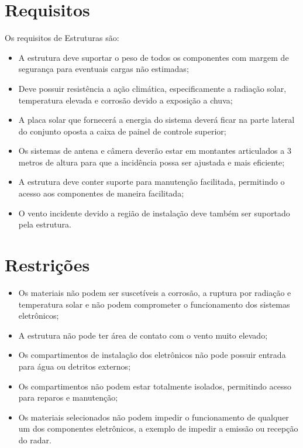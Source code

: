 \section{Requisitos}

Os requisitos de Estruturas são:


\begin{itemize}
\item A estrutura deve suportar o peso de todos os componentes com margem de segurança para eventuais cargas não estimadas;
\item Deve possuir resistência a ação climática, especificamente a radiação solar, temperatura elevada e corrosão devido a exposição a chuva;
\item A placa solar que fornecerá a energia do sistema deverá ficar na parte lateral do conjunto oposta a caixa de painel de controle superior;
\item Os sistemas de antena e câmera deverão estar em montantes articulados a 3 metros de altura para que a incidência possa ser ajustada e mais eficiente;
\item A estrutura deve conter suporte para manutenção facilitada, permitindo o acesso aos componentes de maneira facilitada;
\item O vento incidente devido a região de instalação deve também ser suportado pela estrutura.
\end{itemize}

\section{Restrições}
\begin{itemize}
\item Os materiais não podem ser suscetíveis a corrosão, a ruptura por radiação e temperatura solar e não podem comprometer o funcionamento dos sistemas eletrônicos;
\item A estrutura não pode ter área de contato com o vento muito elevado;
\item Os compartimentos de instalação dos eletrônicos não pode possuir entrada para água ou detritos externos;
\item Os compartimentos não podem estar totalmente isolados, permitindo acesso para reparos e manutenção;
\item Os materiais selecionados não podem impedir o funcionamento de qualquer um dos componentes eletrônicos, a exemplo de impedir a emissão ou recepção do radar.
\end{itemize}

